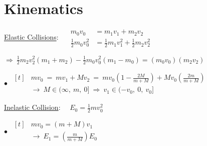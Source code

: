 \documentclass[12pt]{article}
\begin{document}
%
%
\newpage

\section{Kinematics}
\begin{minipage}[t]{.6\textwidth}
    \underline{Elastic Collisions}: \ \ \(
        \begin{aligned}
            m_0 v_0 &= m_1 v_1 + m_2 v_2\\[5pt]
            \tfrac{1}{2} m_0 v_0^2 &= \tfrac{1}{2} m_1 v_1^2 + \tfrac{1}{2} m_2 v_2^2
        \end{aligned}  
    \)

    \vspace{7pt}
    \(\Rightarrow\ \boxed{ 
        \tfrac{1}{2} m_2 v_2^2 (m_1 + m_2) - \tfrac{1}{2} m_0 v_0^2 (m_1 - m_0) 
        = (m_0 v_0)(m_2 v_2) 
    }\)

    \vspace{10pt}\noindent
    \(
        \bullet\ \ \boxed{ \begin{aligned}[t]
            & m v_0 \ =\ m v_1 + M v_2 
                \ =\ 
                m v_0 \left( 1 - \tfrac{2M}{m+M} \right) + M v_0 \left( \tfrac{2m}{m + M} \right) 
                \\[5pt]
            & \rightarrow\
                M \in (\infty,\ m,\ 0] 
                \ \Rightarrow\ 
                v_1 \in (-v_0,\ 0,\ v_0]
        \end{aligned} }
    \)
\end{minipage}
\hfill
\begin{minipage}[t]{.35\textwidth}
    \underline{Inelastic Collision}: \ \ \(E_0 = \tfrac{1}{2} m v_0^2\)

    \vspace{7pt} 
    \(\bullet\ \ \boxed{ \begin{aligned}[t]
        & m v_0 = (m + M) v_1 \\[5pt]
        & \rightarrow\ E_1 = \left( \tfrac{m}{m+M} \right) E_0
    \end{aligned}} \)
\end{minipage}

\vspace{10pt}
\end{document}
